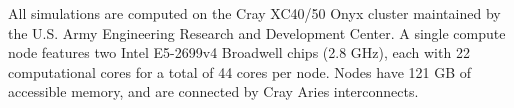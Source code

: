 All simulations are computed on the Cray XC40/50 Onyx cluster maintained by the U.S. Army Engineering Research and Development Center. A single compute node features two Intel E5-2699v4 Broadwell chips (2.8 GHz), each with 22 computational cores for a total of 44 cores per node. Nodes have 121 GB of accessible memory, and are connected by Cray Aries interconnects.